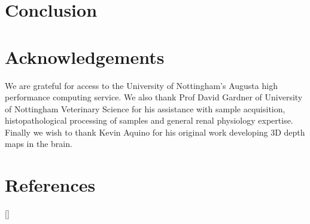 \section{Conclusion}

\section{Acknowledgements}

We are grateful for access to the University of Nottingham's Augusta high performance computing service. We also thank Prof David Gardner of University of Nottingham Veterinary Science for his assistance with sample acquisition, histopathological processing of samples and general renal physiology expertise. Finally we wish to thank Kevin Aquino for his original work developing 3D depth maps in the brain.

\newpage
\section{References}
[\refname]{}
\printbibliography